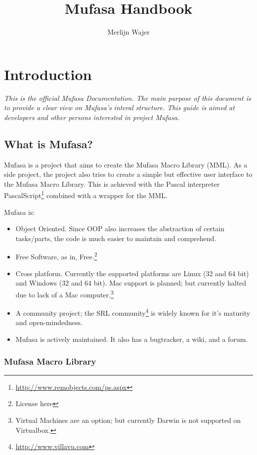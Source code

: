 \documentclass[a4paper, 10pt]{report} %
\begin{document}
\title{Mufasa Handbook}
\author{Merlijn Wajer}
\maketitle

\chapter{Introduction}

\emph{This is the official Mufasa Documentation.
The main purpose of this document is to provide a clear view on Mufasa's 
interal structure. This guide is aimed at developers and other persons
interested in project Mufasa.}

\section{What is Mufasa?}

Mufasa is a project that aims to create the Mufasa Macro Library (MML).
As a side project, the project also tries to create a simple but effective
user interface to the Mufasa Macro Library. This is achieved with the
Pascal interpreter PascalScript\footnote{\url{http://www.remobjects.com/ps.aspx}}
combined with a wrapper for the MML.

Mufasa is:
\begin{itemize}
	\item Object Oriented. Since OOP also increases the abstraction of
		  certain tasks/parts, the code is much easier to maintain and
		  comprehend.
	\item Free Software, as in, Free.\footnote{License here}
	\item Cross platform. Currently the supported platforms are Linux 
		  (32 and 64 bit) and Windows (32 and 64 bit).
		  Mac support is planned; but currently halted due to lack of a
		  Mac computer.\footnote{Virtual Machines are an option;
		  but currently Darwin is not supported on Virtualbox.}
	\item A community project; the SRL community\footnote{
			\url{http://www.villavu.com}}
		  is widely known for it's maturity and open-mindedness.
	\item Mufasa is actively maintained. It also has a bugtracker,
		  a wiki, and a forum.
\end{itemize}

\pagebreak

\subsection{Mufasa Macro Library}
\end{document}
